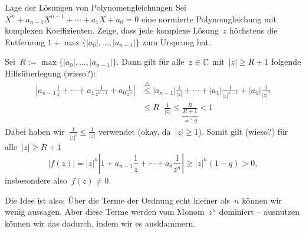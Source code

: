 \documentclass{algblatt}
\begin{document}
\vspace*{-1.5cm}

\begin{aufgabe}{Lage der Lösungen von Polynomengleichungen}
Sei $X^n + a_{n - 1} X^{n - 1} + \cdots + a_1 X + a_0 = 0$ eine normierte
Polynomgleichung mit komplexen Koeffizienten. Zeige, dass jede komplexe
Lösung~$z$ höchstens die Entfernung
$1+\max\{|a_0|,\ldots,|a_{n-1}|\}$ zum Ursprung hat.
\begin{loesung}
Sei~$R := \max\{|a_0|,\ldots,|a_{n-1}|\}$. Dann gilt für
alle~$z \in \mathbb{C}$ mit~$|z| \geq R + 1$ folgende Hilfsüberlegung (wieso?):
\begin{align*}
  \left|a_{n-1} \frac{1}{z} + \cdots + a_1 \frac{1}{z^{n-1}} + a_0
  \frac{1}{z^n}\right| &\stackrel{\triangle}{\leq}
  |a_{n-1}| \frac{1}{|z|} + \cdots + |a_1| \frac{1}{|z|^{n-1}} + |a_0|
  \frac{1}{|z|^n} \\
  &\leq R \cdot \frac{1}{|z|}
  \leq \underbrace{\frac{R}{R+1}}_{=:\,q} < 1
\end{align*}
Dabei haben wir~$\frac{1}{|z|^i} \leq \frac{1}{|z|}$ verwendet (okay, da~$|z|
\geq 1$).
Somit gilt (wieso?) für alle~$|z| \geq R + 1$
\[ |f(z)| = |z|^n \left|1 + a_{n-1} \frac{1}{z} + \cdots + a_0 \frac{1}{z^n}\right|
  \geq |z|^n \left(1 - q\right) > 0, \]
insbesondere also~$f(z) \neq 0$.

Die Idee ist also: Über die Terme der Ordnung echt kleiner als~$n$ können wir
wenig aussagen. Aber diese Terme werden vom Monom~$z^n$ dominiert -- ausnutzen
können wir das dadurch, indem wir es ausklammern.
\end{loesung}
\end{aufgabe}
\end{document}
